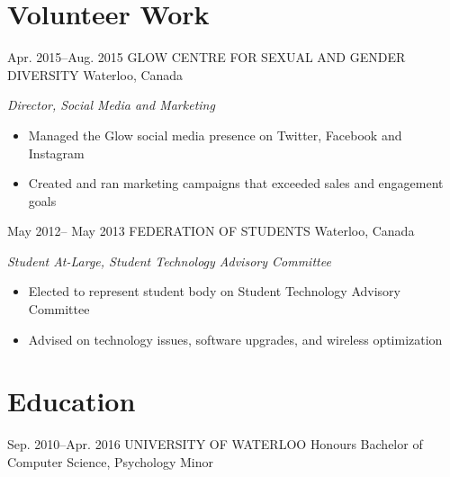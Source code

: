 \documentclass[]{friggeri-cv} %
\begin{document}
\vspace{-2.5\parskip}
\section{Volunteer Work}


\begin{sectionlist}
	
	\entry
	{Apr. 2015--Aug. 2015}
	{GLOW CENTRE FOR SEXUAL AND GENDER DIVERSITY}
	{Waterloo, Canada}
	{\emph{Director, Social Media and Marketing} \\
		\begin{itemize}
			\item Managed the Glow social media presence on Twitter, Facebook and Instagram
			\item Created and ran marketing campaigns that exceeded sales and engagement goals  
		\end{itemize}
	}
	
	
	\entry
	{May 2012-- May 2013}
	{FEDERATION OF STUDENTS}
	{Waterloo, Canada}
	{\emph{Student At-Large, Student Technology Advisory Committee} \\
		\begin{itemize}
			\item Elected to represent student body on Student Technology Advisory Committee
			\item Advised on technology issues, software upgrades, and wireless optimization 
		\end{itemize}
	}	
	
	
\end{sectionlist}

\vspace{-2.5\parskip}
\section{Education}

\begin{sectionlist}
		
	\education
	{Sep. 2010--Apr. 2016}
	{UNIVERSITY OF WATERLOO}
	{Honours Bachelor of Computer Science, Psychology Minor}
	
\end{sectionlist}

\vspace{-5\parskip}
\end{document}
